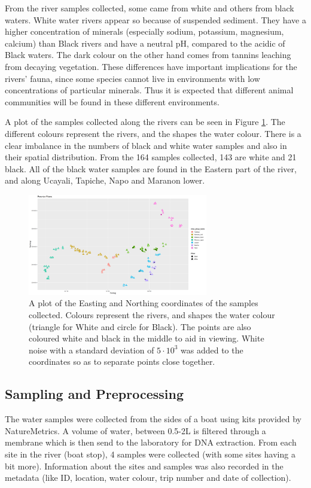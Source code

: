From the river samples collected, some came from white and others from black waters. White water rivers appear so because of suspended  sediment. They have a higher concentration of minerals (especially sodium, potassium, magnesium, calcium) than Black rivers and have a neutral pH, compared to the acidic of Black waters. The dark colour on the other hand comes from tannins leaching from decaying vegetation. These differences have important implications for the rivers' fauna, since some species cannot live in  environments with low concentrations of particular minerals. Thus it is expected that different animal communities will be found in these different environments. 

A plot of the samples collected along the rivers can be seen in Figure \ref{fig:graphmap}. The different colours represent the rivers, and the shapes the water colour. There is a clear imbalance in the numbers of black and white water samples and also in their spatial distribution. From the 164 samples collected, 143 are white and 21 black. All of the black water samples are found in the Eastern part of the river, and along Ucayali, Tapiche, Napo and Maranon lower. 

\begin{figure}
	\centering
	\includegraphics[width=0.7\textwidth]{mapofrivers}
	\caption{A plot of the Easting and Northing coordinates of the samples collected. Colours represent the rivers, and shapes the water colour (triangle for White and circle for Black). The points are also coloured white and black in the middle to aid in viewing. White noise with a standard deviation of $5 \cdot 10^3$ was added to the coordinates so as to separate points close together.}
	\label{fig:graphmap}
\end{figure}
\subsection{Sampling and Preprocessing}
The water samples were collected from the sides of a boat using kits provided by NatureMetrics. A volume of water, between 0.5-2L is filtered through a membrane which is then send to the laboratory for DNA extraction. From each site in the river (boat stop), 4 samples were collected (with some sites having a bit more). Information about the sites and samples was also recorded in the metadata (like ID, location, water colour, trip number and date of collection). 

